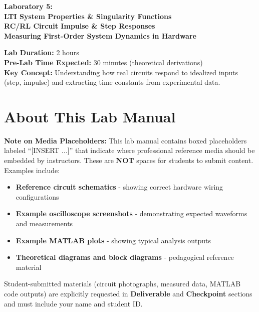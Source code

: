 \documentclass[11pt,letterpaper]{article}
\begin{document}
\begin{center}
\huge{\bf Laboratory 5:}\\
\vspace{0.2in}
\Large{\bf LTI System Properties \& Singularity Functions}\\
\Large{\bf RC/RL Circuit Impulse \& Step Responses}\\
\vspace{0.2in}
\normalsize{\bf Measuring First-Order System Dynamics in Hardware}
\end{center}

\vspace{0.3in}
\noindent
\textbf{Lab Duration:} 2 hours\\
\textbf{Pre-Lab Time Expected:} 30 minutes (theoretical derivations)\\
\textbf{Key Concept:} Understanding how real circuits respond to idealized inputs (step, impulse) and extracting time constants from experimental data.

\tableofcontents
\clearpage

\section*{About This Lab Manual}

\textbf{Note on Media Placeholders:} This lab manual contains boxed placeholders labeled ``[INSERT ...]'' that indicate where professional reference media should be embedded by instructors. These are \textbf{NOT} spaces for students to submit content. Examples include:

\begin{itemize}
    \item \textbf{Reference circuit schematics} - showing correct hardware wiring configurations
    \item \textbf{Example oscilloscope screenshots} - demonstrating expected waveforms and measurements
    \item \textbf{Example MATLAB plots} - showing typical analysis outputs
    \item \textbf{Theoretical diagrams and block diagrams} - pedagogical reference material
\end{itemize}

\noindent Student-submitted materials (circuit photographs, measured data, MATLAB code outputs) are explicitly requested in \textbf{Deliverable} and \textbf{Checkpoint} sections and must include your name and student ID.
\end{document}
